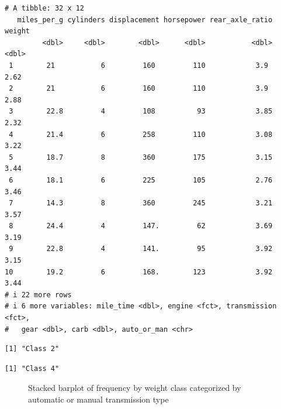 \documentclass[
  man,
  floatsintext,
  longtable,
  nolmodern,
  notxfonts,
  notimes,
  colorlinks=true,linkcolor=blue,citecolor=blue,urlcolor=blue]{apa7}
\begin{document}
\begin{verbatim}
# A tibble: 32 x 12
   miles_per_g cylinders displacement horsepower rear_axle_ratio weight
         <dbl>     <dbl>        <dbl>      <dbl>           <dbl>  <dbl>
 1        21           6         160         110            3.9    2.62
 2        21           6         160         110            3.9    2.88
 3        22.8         4         108          93            3.85   2.32
 4        21.4         6         258         110            3.08   3.22
 5        18.7         8         360         175            3.15   3.44
 6        18.1         6         225         105            2.76   3.46
 7        14.3         8         360         245            3.21   3.57
 8        24.4         4         147.         62            3.69   3.19
 9        22.8         4         141.         95            3.92   3.15
10        19.2         6         168.        123            3.92   3.44
# i 22 more rows
# i 6 more variables: mile_time <dbl>, engine <fct>, transmission <fct>,
#   gear <dbl>, carb <dbl>, auto_or_man <chr>
\end{verbatim}

\begin{verbatim}
[1] "Class 2"
\end{verbatim}

\begin{verbatim}
[1] "Class 4"
\end{verbatim}

\begin{figure}

\caption{\label{fig-plot6-stacked-barplot}Stacked barplot of frequency
by weight class categorized by automatic or manual transmission type}


\end{figure}%
\end{document}
